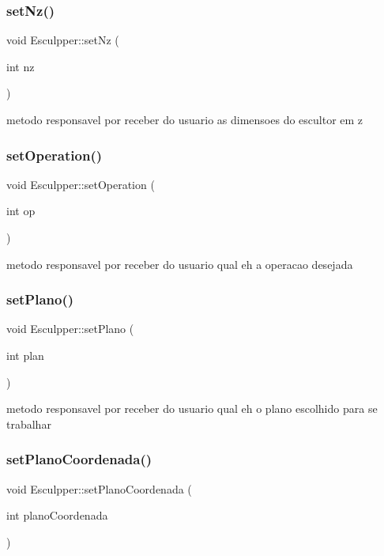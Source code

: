 \subsubsection{\texorpdfstring{setNz()}{setNz()}}
{\footnotesize\ttfamily void Esculpper\+::set\+Nz (\begin{DoxyParamCaption}\item[{int}]{nz }\end{DoxyParamCaption})}

metodo responsavel por receber do usuario as dimensoes do escultor em z \mbox{\label{class_esculpper_a7e83952f6516f052cb55eb271e31fa65}} 
\subsubsection{\texorpdfstring{setOperation()}{setOperation()}}
{\footnotesize\ttfamily void Esculpper\+::set\+Operation (\begin{DoxyParamCaption}\item[{int}]{op }\end{DoxyParamCaption})}

metodo responsavel por receber do usuario qual eh a operacao desejada \mbox{\label{class_esculpper_a8590fa3cbbbf52cd04ca44b2b06ed0bf}} 
\subsubsection{\texorpdfstring{setPlano()}{setPlano()}}
{\footnotesize\ttfamily void Esculpper\+::set\+Plano (\begin{DoxyParamCaption}\item[{int}]{plan }\end{DoxyParamCaption})}

metodo responsavel por receber do usuario qual eh o plano escolhido para se trabalhar \mbox{\label{class_esculpper_a5d3a9022e6a7e238d7c0d2cc4a3f7ab5}} 
\subsubsection{\texorpdfstring{setPlanoCoordenada()}{setPlanoCoordenada()}}
{\footnotesize\ttfamily void Esculpper\+::set\+Plano\+Coordenada (\begin{DoxyParamCaption}\item[{int}]{plano\+Coordenada }\end{DoxyParamCaption})}

